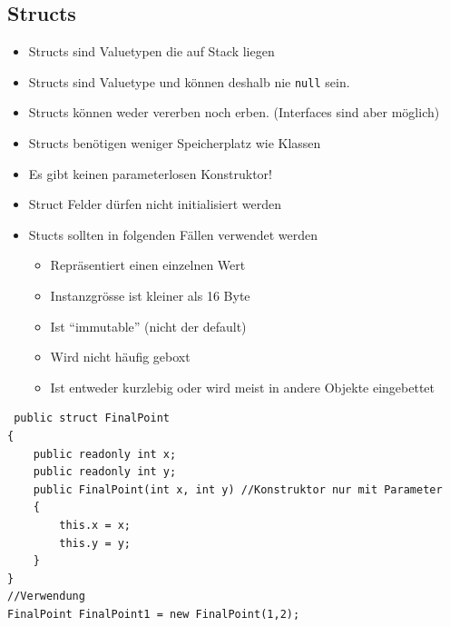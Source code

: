 \documentclass[
a4paper,
oneside,
10pt,
fleqn,
headsepline,
toc=listofnumbered, 
bibliography=totocnumbered]{scrartcl}
\begin{document}
\subsection{Structs}
\begin{itemize}
	\item Structs sind Valuetypen die auf Stack liegen
	\item Structs sind Valuetype und können deshalb nie \lstinline[]|null| sein.
	\item Structs können weder vererben noch erben. (Interfaces sind aber möglich)
	\item Structs benötigen weniger Speicherplatz wie Klassen
	\item Es gibt keinen parameterlosen Konstruktor!
	\item Struct Felder dürfen nicht initialisiert werden
	\item Stucts sollten in folgenden Fällen verwendet werden
	      \begin{itemize}
		      \item Repräsentiert einen einzelnen Wert
		      \item Instanzgrösse ist kleiner als 16 Byte
		      \item Ist “immutable” (nicht der default)
		      \item Wird nicht häufig geboxt
		      \item Ist entweder kurzlebig oder wird meist in andere Objekte eingebettet
	      \end{itemize}
\end{itemize}
\begin{lstlisting}
 public struct FinalPoint
{
    public readonly int x;
    public readonly int y; 
    public FinalPoint(int x, int y) //Konstruktor nur mit Parameter
    {
        this.x = x;
        this.y = y;
    }
}
//Verwendung
FinalPoint FinalPoint1 = new FinalPoint(1,2);
\end{lstlisting}
\end{document}
